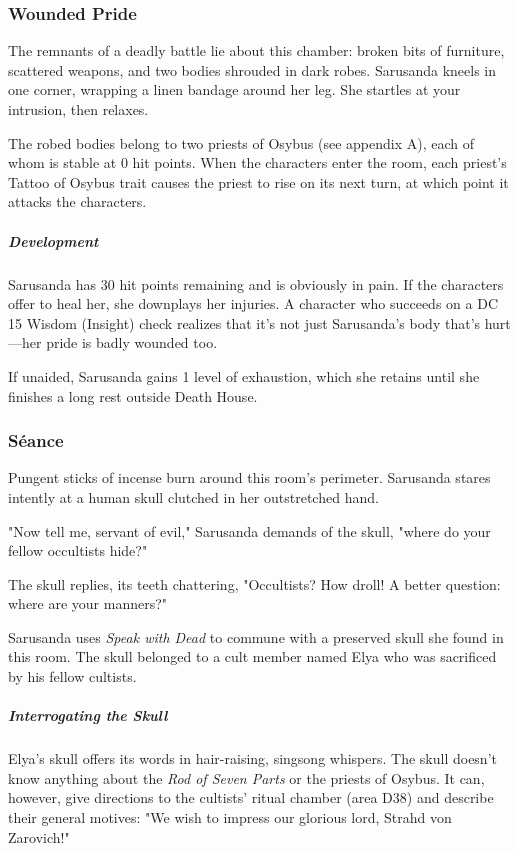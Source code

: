 \documentclass[10pt,a4paper,twoside,bg=print,twocolumn,openany,nodeprecatedcode]{dndbook}
\begin{document}
\subsubsection{Wounded Pride}
\begin{DndReadAloud}{}
The remnants of a deadly battle lie about this chamber: broken bits of furniture, scattered weapons, and two bodies shrouded in dark robes. Sarusanda kneels in one corner, wrapping a linen bandage around her leg. She startles at your intrusion, then relaxes.

\end{DndReadAloud}

The robed bodies belong to two priests of Osybus (see appendix A), each of whom is stable at 0 hit points. When the characters enter the room, each priest's Tattoo of Osybus trait causes the priest to rise on its next turn, at which point it attacks the characters.

\subparagraph{Development}
Sarusanda has 30 hit points remaining and is obviously in pain. If the characters offer to heal her, she downplays her injuries. A character who succeeds on a DC 15 Wisdom (Insight) check realizes that it's not just Sarusanda's body that's hurt—her pride is badly wounded too.

If unaided, Sarusanda gains 1 level of exhaustion, which she retains until she finishes a long rest outside Death House.

\subsubsection{Séance}
\begin{DndReadAloud}{}
Pungent sticks of incense burn around this room's perimeter. Sarusanda stares intently at a human skull clutched in her outstretched hand.

"Now tell me, servant of evil," Sarusanda demands of the skull, "where do your fellow occultists hide?"

The skull replies, its teeth chattering, "Occultists? How droll! A better question: where are your manners?"

\end{DndReadAloud}

Sarusanda uses \textit{Speak with Dead} to commune with a preserved skull she found in this room. The skull belonged to a cult member named Elya who was sacrificed by his fellow cultists.

\subparagraph{Interrogating the Skull}
Elya's skull offers its words in hair-raising, singsong whispers. The skull doesn't know anything about the \textit{Rod of Seven Parts} or the priests of Osybus. It can, however, give directions to the cultists' ritual chamber (area D38) and describe their general motives: "We wish to impress our glorious lord, Strahd von Zarovich!"
\end{document}
